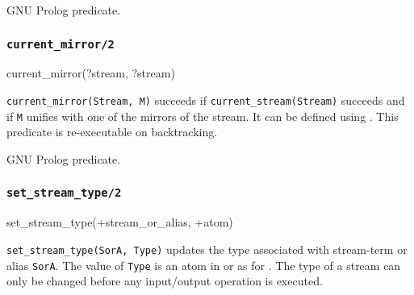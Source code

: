 \Portability

GNU Prolog predicate.

\subsubsection{\texttt{current\_mirror/2}}

\begin{TemplatesOneCol}
current\_mirror(?stream, ?stream)

\end{TemplatesOneCol}

\Description

\texttt{current\_mirror(Stream, M)} succeeds if
\texttt{current\_stream(Stream)} succeeds  and if
\texttt{M} unifies with one of the mirrors of the stream. It can be
defined using  . This
predicate is re-executable on backtracking.

\begin{PlErrors}



\end{PlErrors}

\Portability

GNU Prolog predicate.

\subsubsection{\texttt{set\_stream\_type/2}}
\label{set-stream-type/2}

\begin{TemplatesOneCol}
set\_stream\_type(+stream\_or\_alias, +atom)

\end{TemplatesOneCol}

\Description

\texttt{set\_stream\_type(SorA, Type)} updates the type associated with
stream-term or alias \texttt{SorA}. The value of \texttt{Type} is an atom in
 or  as for  .
The type of a stream can only be changed before any input/output operation
is executed.

